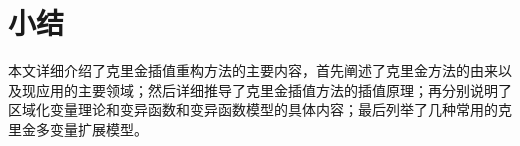 \section{小结}
本文详细介绍了克里金插值重构方法的主要内容，首先阐述了克里金方法的由来以及现应用的主要领域；然后详细推导了克里金插值方法的插值原理；再分别说明了区域化变量理论和变异函数和变异函数模型的具体内容；最后列举了几种常用的克里金多变量扩展模型。
